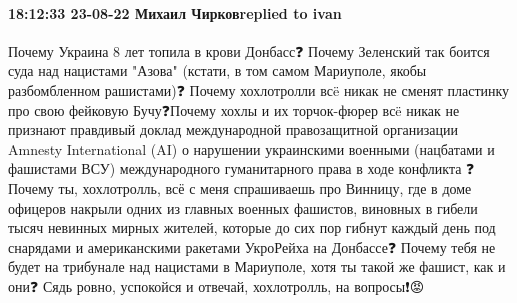  
 
 
 
 

\paragraph{18:12:33 23-08-22 Михаил Чирковreplied to ivan}

Почему Украина 8 лет топила в крови Донбасс❓
Почему Зеленский так боится суда над нацистами "Азова" (кстати, в том самом Мариуполе, якобы разбомбленном рашистами)❓
Почему хохлотролли всë никак не сменят пластинку про свою фейковую Бучу❓Почему хохлы и их торчок-фюрер всë никак не признают правдивый доклад международной правозащитной организации Amnesty International (AI) о нарушении украинскими военными (нацбатами и фашистами ВСУ) международного гуманитарного права в ходе конфликта ❓
Почему ты, хохлотролль, всё с меня спрашиваешь про Винницу, где в доме офицеров накрыли одних из главных военных фашистов, виновных в гибели тысяч невинных мирных жителей, которые до сих пор гибнут каждый день под снарядами и американскими ракетами УкроРейха на Донбассе❓
Почему тебя не будет на трибунале над нацистами в Мариуполе, хотя ты такой же фашист, как и они❓
Сядь ровно, успокойся и отвечай, хохлотролль, на вопросы❗️😡
